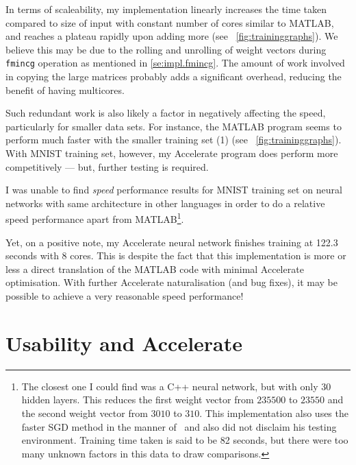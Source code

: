 
In terms of scaleability, my implementation linearly increases the time taken compared to size of input with constant number of cores similar to MATLAB, and reaches a plateau rapidly upon adding more (see ~\ref{fig:traininggraphs}). We believe this may be due to the rolling and unrolling of weight vectors during \texttt{fmincg} operation as mentioned in \ref{se:impl.fmincg}. The amount of work involved in copying the large matrices probably adds a significant overhead, reducing the benefit of having multicores.

Such redundant work is also likely a factor in negatively affecting the speed, particularly for smaller data sets. For instance, the MATLAB program seems to perform much faster with the smaller training set (1) (see ~\ref{fig:traininggraphs}). With MNIST training set, however, my Accelerate program does perform more competitively --- but, further testing is required. 

I was unable to find \textit{speed} performance results for MNIST training set on neural networks with same architecture in other languages in order to do a relative speed performance apart from MATLAB\footnote{The closest one I could find was a C++ neural network\cite{Wol17}, but with only 30 hidden layers. This reduces the first weight vector from $235500$ to $23550$ and the second weight vector from $3010$ to $310$. This implementation also uses the faster SGD method in the manner of~\cite{LeC98} and also did not disclaim his testing environment. Training time taken is said to be 82 seconds, but there were too many unknown factors in this data to draw comparisons.}.

Yet, on a positive note, my Accelerate neural network finishes training at 122.3 seconds with 8 cores. This is despite the fact that this implementation is more or less a direct translation of the MATLAB code with minimal Accelerate optimisation. With further Accelerate naturalisation (and bug fixes), it may be possible to achieve a very reasonable speed performance!

\section{Usability and Accelerate} \label{se:eval.usability}

